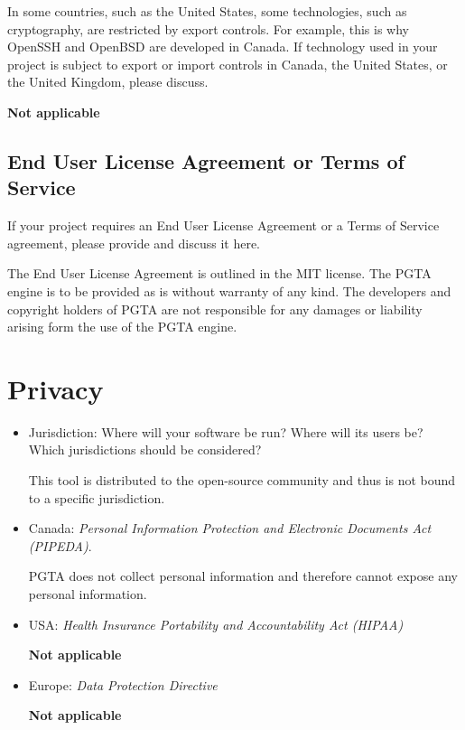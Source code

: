 \documentclass{tufte-handout}
\begin{document}
In some countries, such as the United States, some technologies, such
as cryptography, are restricted by export controls. For example, this
is why OpenSSH and OpenBSD are developed in
Canada. If technology used in your project is subject to export or import
controls in Canada, the United States, or the United Kingdom, please
discuss.

\textbf{Not applicable}

\subsection{End User License Agreement or Terms of Service}

If your project requires an End User License Agreement or a Terms of
Service agreement, please provide and discuss it here.


The End User License Agreement is outlined in the MIT license. The PGTA engine is to be provided as is without 
warranty of any kind. The developers and copyright holders of PGTA are not responsible for any damages or liability
arising form the use of the PGTA engine.\cite{MIT}

\newpage
\section{Privacy} 

\begin{itemize}

\item Jurisdiction: Where will your software be run? Where will its
users be? Which jurisdictions should be considered?

This tool is distributed to the open-source community and thus is not bound to a specific jurisdiction. 

\item Canada: \emph{Personal
Information Protection and Electronic Documents Act (PIPEDA)}.

PGTA does not collect personal information and therefore cannot expose any personal information. 

\item USA: \emph{Health Insurance Portability and Accountability Act
(HIPAA)} 

\textbf{Not applicable}

\item Europe: \emph{Data Protection Directive}

\textbf{Not applicable}

\end{itemize}
\end{document}
